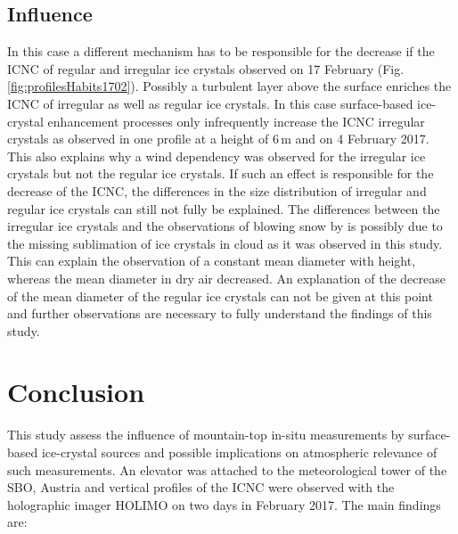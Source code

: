 \documentclass[draft,linenumbers]{agujournal}
\begin{document}
\subsection{Influence}

In this case a different mechanism has to be responsible for the decrease if the ICNC of regular and irregular ice crystals observed on 17 February (Fig. \ref{fig:profilesHabits1702}). Possibly a turbulent layer above the surface enriches the ICNC of irregular as well as regular ice crystals. In this case surface-based ice-crystal enhancement processes only infrequently increase the ICNC irregular crystals as observed in one profile at a height of 6\,\si{m} and on 4 February 2017. This also explains why a wind dependency was observed for the irregular ice crystals but not the regular ice crystals. If such an effect is responsible for the decrease of the ICNC, the differences in the size distribution of irregular and regular ice crystals can still not fully be explained. The differences between the irregular ice crystals and the observations of blowing snow by \citet{Nis05} is possibly due to the missing sublimation of ice crystals in cloud as it was observed in this study. This can explain the observation of a constant mean diameter with height, whereas the mean diameter in dry air decreased. An explanation of the decrease of the mean diameter of the regular ice crystals can not be given at this point and further observations are necessary to fully understand the findings of this study.

\section{Conclusion}
This study assess the influence of mountain-top in-situ measurements by surface-based ice-crystal sources and possible implications on atmospheric relevance of such measurements. An elevator was attached to the meteorological tower of the SBO, Austria and vertical profiles of the ICNC were observed with the holographic imager HOLIMO on two days in February 2017. The main findings are:
\end{document}
